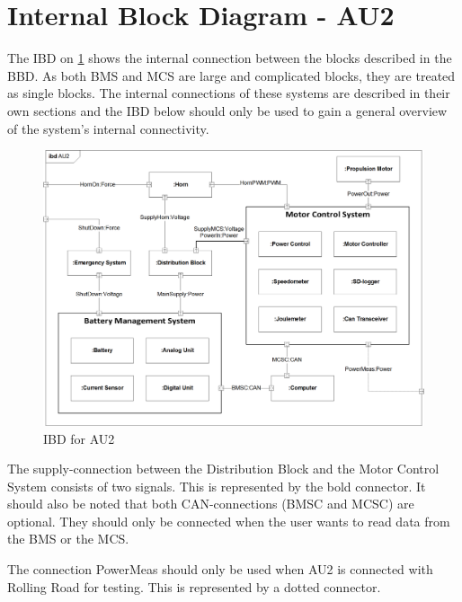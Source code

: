 \section{Internal Block Diagram - AU2}
The IBD on \ref{fig:IBD} shows the internal connection between the blocks described in the BBD. As both BMS and MCS are large and complicated blocks, they are treated as single blocks. The internal connections of these systems are described in their own sections and the IBD below should only be used to gain a general overview of the system's internal connectivity. 

\begin{figure}[H]
	\centering
	\includegraphics[width=1\linewidth]{Architecture/Diagrams/IBD_AU2}
	\caption{IBD for AU2}
	\label{fig:IBD}
\end{figure}

The supply-connection between the Distribution Block and the Motor Control System consists of two signals. This is represented by the bold connector. It should also be noted that both CAN-connections (BMSC and MCSC) are optional. They should only be connected when the user wants to read data from the BMS or the MCS.

The connection PowerMeas should only be used when AU2 is connected with Rolling Road for testing. This is represented by a dotted connector.